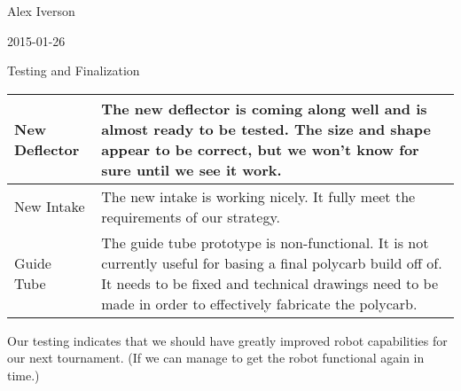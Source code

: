 Alex Iverson

2015-01-26

Testing and Finalization

\begin{tabular}{|p{5cm}|p{5cm}|}
 \hline
 New Deflector&
 The new deflector is coming along well and is almost ready to be tested. The size and shape appear to be correct, but we won't know for sure until we see it work.\\
 \hline
 New Intake&
 The new intake is working nicely. It fully meet the requirements of our strategy.\\
 \hline
 Guide Tube&
 The guide tube prototype is non-functional. It is not currently useful for basing a final polycarb build off of. It needs to be fixed and technical drawings need to be made in order to effectively fabricate the polycarb.
\end{tabular}

Our testing indicates that we should have greatly improved robot capabilities for our next tournament. (If we can manage to get the robot functional again in time.)